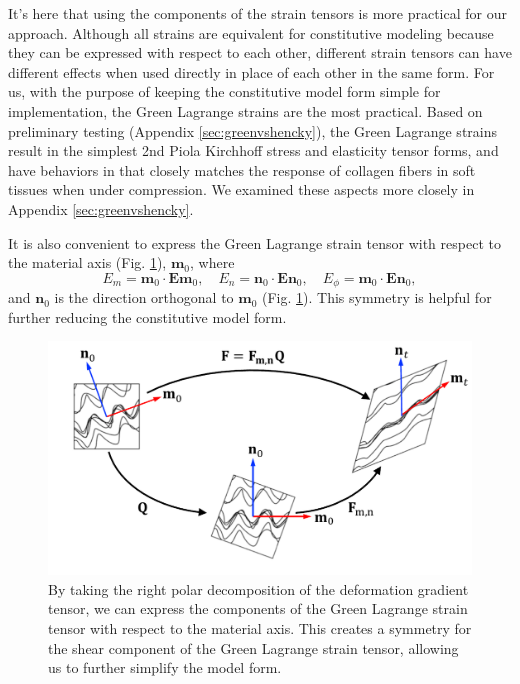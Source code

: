     
    It's here that using the components of the strain tensors is more practical for our approach. Although all strains are equivalent for constitutive modeling because they can be expressed with respect to each other, different strain tensors can have different effects when used directly in place of each other in the same form. For us, with the purpose of keeping the constitutive model form simple for implementation, the Green Lagrange strains are the most practical. Based on preliminary testing (Appendix \ref{sec:greenvshencky}), the Green Lagrange strains result in the simplest 2nd Piola Kirchhoff stress and elasticity tensor forms, and have behaviors in that closely matches the response of collagen fibers in soft tissues when under compression. We examined these aspects more closely in Appendix \ref{sec:greenvshencky}. 
    
    It is also convenient to express the Green Lagrange strain tensor with respect to the material axis (Fig. \ref{fig:greenkinematics}), $\mathbf{m}_0$, where
\begin{equation} \label{eqn:greenstrain}
E_m = \mathbf{m}_0\cdot\mathbf{E}\mathbf{m}_0, \quad E_n = \mathbf{n}_0\cdot\mathbf{E}\mathbf{n}_0, \quad E_{\phi} = \mathbf{m}_0\cdot\mathbf{E}\mathbf{n}_0,
\end{equation} 
    and $\mathbf{n}_0$ is the direction orthogonal to $\mathbf{m}_0$ (Fig. \ref{fig:greenkinematics}). This symmetry is helpful for further reducing the constitutive model form. 


\begin{figure}
\centering
\includegraphics[width=5.0in]{Images/chapter5/greenkinematics.pdf}
\caption{By taking the right polar decomposition of the deformation gradient tensor, we can express the components of the Green Lagrange strain tensor with respect to the material axis. This creates a symmetry for the shear component of the Green Lagrange strain tensor, allowing us to further simplify the model form.}
\label{fig:greenkinematics}
\end{figure}












